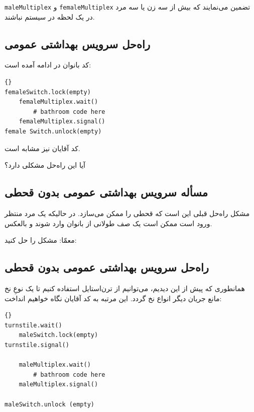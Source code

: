 \documentclass{book}
\newcommand{\clearemptydoublepage}{\newpage\cleardoublepage}
\begin{document}
    {\tt maleMultiplex} و {\tt femaleMultiplex}  
    تضمین می‌نمایند که بیش از سه زن یا سه مرد در یک لحظه در سیستم نباشند. 


\clearemptydoublepage
\subsection{راه‌حل سرویس بهداشتی عمومی}

    کد بانوان در ادامه آمده است: 

\begin{latin}
\begin{lstlisting}[title=\rl{راه‌حل سرویس بهداشتی عمومی (بانوان)}]{}
femaleSwitch.lock(empty)
    femaleMultiplex.wait()
        # bathroom code here
    femaleMultiplex.signal()
female Switch.unlock(empty)
\end{lstlisting}
\end{latin}

    کد آقایان نیز مشابه است. 

    آیا این راه‌حل مشکلی دارد؟

\clearemptydoublepage
\subsection{مسأله سرویس بهداشتی عمومی بدون قحطی}

    مشکل راه‌حل قبلی این است که قحطی را ممکن می‌سازد. در حالیکه یک مرد منتظر ورود است  ممکن است یک صف طولانی از بانوان وارد شوند و بالعکس. 

    معمّا: مشکل را حل کنید: 


\clearemptydoublepage
\subsection{راه‌حل سرویس بهداشتی عمومی بدون قحطی}

    همانطوری که پیش از این دیدیم، می‌توانیم از ترن‌استایل استفاده کنیم تا یک نوعِ نخ‌ مانع جریان دیگر انواع نخ گردد. این مرتبه به کد آقایان نگاه خواهیم انداخت: 

\begin{latin}
\begin{lstlisting}[title=\rl{راه‌حل سرویس بهداشتی عمومی  بدون قحطی(آقایان)}]{}
turnstile.wait()
    maleSwitch.lock(empty)
turnstile.signal()

    maleMultiplex.wait()
        # bathroom code here
    maleMultiplex.signal()

maleSwitch.unlock (empty)
\end{lstlisting}
\end{latin}
\end{document}
